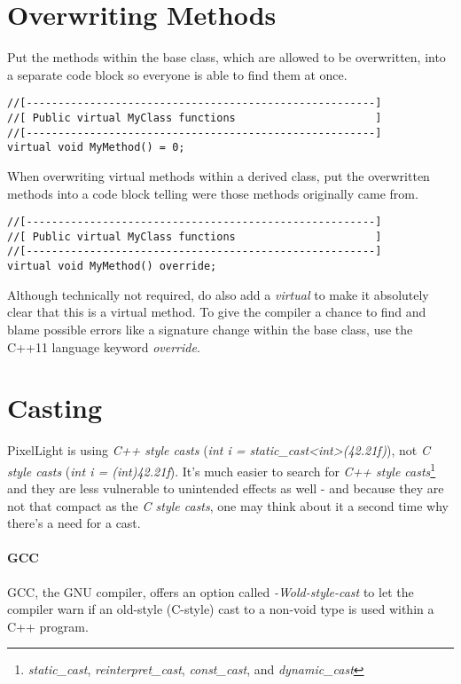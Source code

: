 \section{Overwriting Methods}
Put the methods within the base class, which are allowed to be overwritten, into a separate code block so everyone is able to find them at once.
\begin{lstlisting}[caption=Virtual methods within a base class]
//[-------------------------------------------------------]
//[ Public virtual MyClass functions                      ]
//[-------------------------------------------------------]
virtual void MyMethod() = 0;
\end{lstlisting}

When overwriting virtual methods within a derived class, put the overwritten methods into a code block telling were those methods originally came from.
\begin{lstlisting}[caption=Overwriting virtual methods within a derived class]
//[-------------------------------------------------------]
//[ Public virtual MyClass functions                      ]
//[-------------------------------------------------------]
virtual void MyMethod() override;
\end{lstlisting}
Although technically not required, do also add a \emph{virtual} to make it absolutely clear that this is a virtual method. To give the compiler a chance to find and blame possible errors like a signature change within the base class, use the C++11 language keyword \emph{override}.




\section{Casting}
PixelLight is using \emph{C++ style casts} (\emph{int i = static\_cast<int>(42.21f)}), not \emph{C style casts} (\emph{int i = (int)42.21f}). It's much easier to search for \emph{C++ style casts}\footnote{\emph{static\_cast}, \emph{reinterpret\_cast}, \emph{const\_cast}, and \emph{dynamic\_cast}} and they are less vulnerable to unintended effects as well - and because they are not that compact as the \emph{C style casts}, one may think about it a second time why there's a need for a cast.

\paragraph{GCC}
GCC, the GNU compiler, offers an option called \emph{-Wold-style-cast} to let the compiler warn if an old-style (C-style) cast to a non-void type is used within a C++ program.




